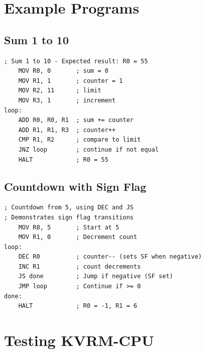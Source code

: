 \documentclass[11pt,a4paper]{article}
\begin{document}
\section{Example Programs}

\subsection{Sum 1 to 10}

\begin{lstlisting}[caption={programs/sum\_1\_to\_10.asm}]
; Sum 1 to 10 - Expected result: R0 = 55
    MOV R0, 0       ; sum = 0
    MOV R1, 1       ; counter = 1
    MOV R2, 11      ; limit
    MOV R3, 1       ; increment
loop:
    ADD R0, R0, R1  ; sum += counter
    ADD R1, R1, R3  ; counter++
    CMP R1, R2      ; compare to limit
    JNZ loop        ; continue if not equal
    HALT            ; R0 = 55
\end{lstlisting}

\subsection{Countdown with Sign Flag}

\begin{lstlisting}[caption={programs/countdown.asm}]
; Countdown from 5, using DEC and JS
; Demonstrates sign flag transitions
    MOV R0, 5       ; Start at 5
    MOV R1, 0       ; Decrement count
loop:
    DEC R0          ; counter-- (sets SF when negative)
    INC R1          ; count decrements
    JS done         ; Jump if negative (SF set)
    JMP loop        ; Continue if >= 0
done:
    HALT            ; R0 = -1, R1 = 6
\end{lstlisting}

\section{Testing KVRM-CPU}
\end{document}
